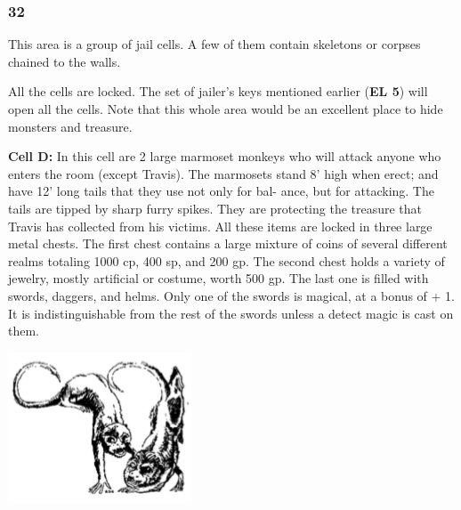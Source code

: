 \documentclass[palace_of_the_silver_princess]{subfiles}
\begin{document}
\subsubsection{32}
\begin{quotebox}
    This area is a group of jail cells. A few of them contain skeletons
    or corpses chained to the walls.
\end{quotebox}

All the cells are locked. The set of jailer’s keys mentioned earlier
(\textbf{EL 5}) will open all the cells. Note that this whole area would be an
excellent place to hide monsters and treasure.

\textbf{Cell D:} In this cell are 2 large marmoset monkeys who will
attack anyone who enters the room (except Travis). The marmosets stand
8’ high when erect; and have 12’ long tails that they use not only for
bal- ance, but for attacking. The tails are tipped by sharp furry
spikes. They are protecting the treasure that Travis has collected
from his victims. All these items are locked in three large metal
chests. The first chest contains a large mixture of coins of several
different realms totaling 1000 cp, 400 sp, and 200 gp. The second chest
holds a variety of jewelry, mostly artificial or costume, worth 500 gp.
The last one is filled with swords, daggers, and helms. Only one of the
swords is magical, at a bonus of + 1. It is indistinguishable from the
rest of the swords unless a detect magic is cast on them.

\includegraphics[width=\columnwidth]{img/marmoset.png}
\end{document}
